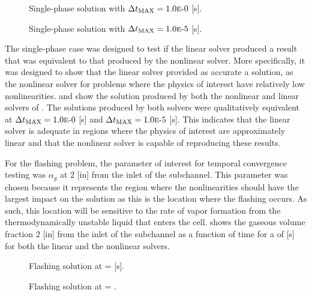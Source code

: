 \begin{figure}[h!tb]
\centering

\caption{Single-phase solution with $\dtmax{} = \expneg{1.0}{0}$ [s].}
\label{fig:single1pt000em0}
\end{figure}

\begin{figure}[h!tb]
\centering

\caption{Single-phase solution with $\dtmax{} = \expneg{1.0}{5}$ [s].}
\label{fig:single1pt000em5}
\end{figure}

The single-phase case was designed to test if the linear solver produced a result that was equivalent to that produced by the nonlinear solver.
More specifically, it was designed to show that the linear solver provided as accurate a solution, as the nonlinear solver for problems where the physics of interest have relatively low nonlinearities.
 and  show the solution produced by both the nonlinear and linear solvers of \cobra{}.
The solutions produced by both solvers were qualitatively equivalent at $\dtmax{} = \expneg{1.0}{0}$ [s] and $\dtmax{} = \expneg{1.0}{5}$ [s].
This indicates that the linear solver is adequate in regions where the physics of interest are approximately linear and that the nonlinear solver is capable of reproducing these results.

For the flashing problem, the parameter of interest for temporal convergence testing was $\alpha_g$ at 2 [in] from the inlet of the subchannel.
This parameter was chosen because it represents the region where the nonlinearities should have the largest impact on the solution as this is the location where the flashing occurs.
As such, this location will be sensitive to the rate of vapor formation from the thermodynamically unstable liquid that enters the cell.
 shows the gaseous volume fraction 2 [in] from the inlet of the subchannel as a function of time for a \dtmax{} of  [s] for both the linear and the nonlinear solvers.

\begin{figure}[h!tb]
\centering

\caption{Flashing solution at \dtmax{} =  {[s]}.}
\label{fig:flashing1pt0000em0}
\end{figure}

\begin{figure}[h!tb]
\centering

\caption{Flashing solution at \dtmax{} = .}
\label{fig:flashing1pt0000em5}
\end{figure}

